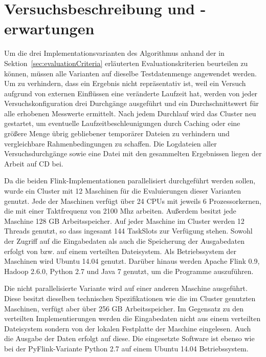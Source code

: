 \section{Versuchsbeschreibung und -erwartungen}
Um die drei Implementationsvarianten des Algorithmus anhand der in Sektion~\ref{sec:evaluationCriteria} erläuterten Evaluationskriterien beurteilen zu können, müssen alle Varianten auf dieselbe Testdatenmenge angewendet werden. Um zu verhindern, dass ein Ergebnis nicht repräsentativ ist, weil ein Versuch aufgrund von externen Einflüssen eine veränderte Laufzeit hat, werden von jeder Versuchskonfiguration drei Durchgänge ausgeführt und ein Durchschnittswert für alle erhobenen Messwerte ermittelt. Nach jedem Durchlauf wird das Cluster neu gestartet, um eventuelle Laufzeitbeschleunigungen durch Caching oder eine größere Menge übrig gebliebener temporärer Dateien zu verhindern und vergleichbare Rahmenbedingungen zu schaffen. Die Logdateien aller Versuchsdurchgänge sowie eine Datei mit den gesammelten Ergebnissen liegen der Arbeit auf CD bei.

Da die beiden Flink-Implementationen parallelisiert durchgeführt werden sollen, wurde ein Cluster mit 12 Maschinen für die Evaluierungen dieser Varianten genutzt. Jede der Maschinen verfügt über 24 CPUs mit jeweils 6 Prozessorkernen, die mit einer Taktfrequenz von 2100 Mhz arbeiten. Außerdem besitzt jede Maschine 128 GB Arbeitsspeicher. Auf jeder Maschine im Cluster werden 12 Threads genutzt, so dass ingesamt 144 TaskSlots zur Verfügung stehen. Sowohl der Zugriff auf die Eingabedaten als auch die Speicherung der Ausgabedaten erfolgt von bzw. auf einem verteilten Dateisystem. Als Betriebssystem der Maschinen wird Ubuntu 14.04 genutzt. Darüber hinaus werden Apache Flink 0.9, Hadoop 2.6.0, Python 2.7 und Java 7 genutzt, um die Programme auszuführen.

Die nicht parallelisierte Variante wird auf einer anderen Maschine ausgeführt. Diese besitzt dieselben technischen Spezifikationen wie die im Cluster genutzten Maschinen, verfügt aber über 256 GB Arbeitsspeicher. Im Gegensatz zu den verteilten Implementierungen werden die Eingabedaten nicht aus einem verteilten Dateisystem sondern von der lokalen Festplatte der Maschine eingelesen. Auch die Ausgabe der Daten erfolgt auf diese. Die eingesetzte Software ist ebenso wie bei der PyFlink-Variante Python 2.7 auf einem Ubuntu 14.04 Betriebssystem.

